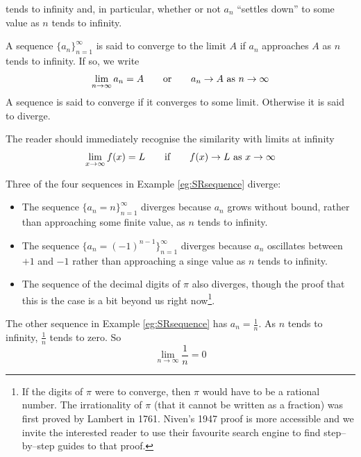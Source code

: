 tends to infinity and, in particular, whether or not $a_n$ ``settles down''
to some value as $n$ tends to infinity.
\begin{defn}\label{def:SRsequenceLimit}
A sequence $\big\{a_n\big\}_{n=1}^\infty$ is said to converge to the limit
$A$ if $a_n$ approaches $A$ as $n$ tends to infinity. If so, we write
\begin{equation*}
\lim_{n\rightarrow\infty} a_n=A\qquad\hbox{or}\qquad
a_n\rightarrow A\text{ as }n\rightarrow\infty
\end{equation*}
A sequence is said to converge if it converges to some limit. Otherwise
it is said to diverge.
\end{defn}
The reader should immediately recognise the similarity with limits at infinity
\begin{align*}
  \lim_{x \to \infty} f(x) = L \qquad\hbox{if}\qquad
    f(x) \to L \text{ as } x \to \infty
\end{align*}


\begin{eg}\label{eg:SRsequenceLimA}
Three of the four sequences in Example \ref{eg:SRsequence} diverge:
\begin{itemize}\itemsep1pt \parskip0pt  %
\item The sequence $\big\{a_n=n\big\}_{n=1}^\infty$ diverges because
$a_n$ grows without bound, rather than approaching some finite value,
as $n$ tends to infinity.
\item The sequence $\big\{a_n=(-1)^{n-1}\big\}_{n=1}^\infty$ diverges because $a_n$ oscillates between $+1$ and $-1$
rather than approaching a singe value as $n$ tends to infinity.
\item The sequence of the decimal digits of $\pi$ also diverges, though the proof that this is the case is a
bit beyond us right now\footnote{If the digits of $\pi$ were to converge,
then $\pi$ would have to be a rational number. The irrationality of $\pi$
(that it cannot be written as a fraction) was first proved by Lambert in 1761.
Niven's 1947 proof is more accessible and we invite the interested reader
to use their favourite search engine to find step--by--step guides
to that proof.}.
\end{itemize}
The other sequence in Example \ref{eg:SRsequence} has $a_n=\frac{1}{n}$. As $n$ tends to infinity, $\frac{1}{n}$ tends
to zero. So
\begin{equation*}
\lim_{n\rightarrow\infty} \frac{1}{n}=0
\end{equation*}
\end{eg}


